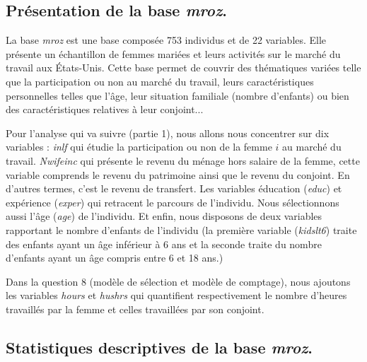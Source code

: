 \subsection*{Présentation de la base \emph{mroz}.}

La base \emph{mroz} est une base composée 753 individus et de 22 variables. Elle présente un échantillon de femmes mariées et leurs activités sur le marché du travail aux États-Unis. Cette base permet de couvrir des thématiques variées telle que la participation ou non au marché du travail, leurs caractéristiques personnelles telles que l'âge, leur situation familiale (nombre d'enfants) ou bien des caractéristiques relatives à leur conjoint... 

\vspace*{0.3cm}

Pour l'analyse qui va suivre (partie 1), nous allons nous concentrer sur dix variables : \emph{inlf} qui étudie la participation ou non de la femme $i$ au marché du travail. \emph{Nwifeinc} qui présente le revenu du ménage hors salaire de la femme, cette variable comprends le revenu du patrimoine ainsi que le revenu du conjoint. En d'autres termes, c'est le revenu de transfert. Les variables éducation (\emph{educ}) et expérience (\emph{exper}) qui retracent le parcours de l'individu. Nous sélectionnons aussi l'âge (\emph{age}) de l'individu. Et enfin, nous disposons de deux variables rapportant le nombre d'enfants de l'individu (la première variable (\emph{kidslt6}) traite des enfants ayant un âge inférieur à 6 ans et la seconde traite du nombre d'enfants ayant un âge compris entre 6 et 18 ans.)

\vspace*{0.3cm}

Dans la question 8 (modèle de sélection et modèle de comptage), nous ajoutons les variables \emph{hours} et \emph{hushrs} qui quantifient respectivement le nombre d'heures travaillés par la femme et celles travaillées par son conjoint.





\subsection{Statistiques descriptives de la base \emph{mroz}.}

